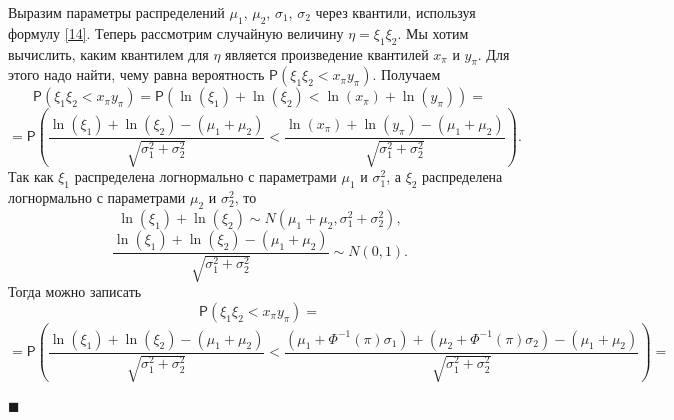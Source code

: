 \documentclass[12pt]{article}
\newenvironment{Proof}{\par\noindent{\bf Доказательство.}}{\hfill$\scriptstyle\blacksquare$}
\begin{document}
	\begin{Proof}
		Выразим параметры распределений $\mu_{1}$, $\mu_{2}$, $\sigma_{1}$, $\sigma_{2}$ через квантили, используя формулу \eqref{14}. Теперь рассмотрим случайную величину $\eta = \xi_{1}\xi_{2}$. Мы хотим вычислить, каким квантилем для $\eta$ является произведение квантилей $x_{\pi}$ и $y_{\pi}$. Для этого надо найти, чему равна вероятность $\mathsf{P}(\xi_{1}\xi_{2}< x_{\pi}y_{\pi})$. Получаем
		\begin{equation*}
			\mathsf{P}(\xi_{1}\xi_{2}< x_{\pi}y_{\pi}) = \mathsf{P}(\ln(\xi_{1})+\ln(\xi_{2})<\ln(x_{\pi})+\ln(y_{\pi}))=
		\end{equation*}
		\begin{equation*}
			=\mathsf{P}\left(\displaystyle{\frac{\ln(\xi_{1})+\ln(\xi_{2})-(\mu_{1}+\mu_{2})}{\sqrt{\sigma_{1}^{2}+\sigma_{2}^{2}}}}<\displaystyle{\frac{\ln(x_{\pi})+\ln(y_{\pi})-(\mu_{1}+\mu_{2})}{\sqrt{\sigma_{1}^{2}+\sigma_{2}^{2}}}}\right).
		\end{equation*}
		Так как $\xi_{1}$ распределена логнормально с параметрами $\mu_{1}$ и $\sigma_{1}^{2}$, а $\xi_{2}$ распределена логнормально с параметрами $\mu_{2}$ и $\sigma_{2}^{2}$, то
		\begin{equation*} 
			\ln(\xi_{1})+\ln(\xi_{2})\sim N(\mu_{1}+\mu_{2}, \sigma_{1}^{2}+\sigma_{2}^{2}),
		\end{equation*}
		\begin{equation*}
			\frac{\ln(\xi_{1})+\ln(\xi_{2})-(\mu_{1}+\mu_{2})}{\sqrt{\sigma_{1}^{2}+\sigma_{2}^{2}}} \sim N(0,1).
		\end{equation*}
		Тогда можно записать
		\begin{equation*}
			\mathsf{P}(\xi_{1}\xi_{2}< x_{\pi}y_{\pi}) =
		\end{equation*}
		\begin{equation*}
			=\mathsf{P}\left(\displaystyle{\frac{\ln(\xi_{1})+\ln(\xi_{2})-(\mu_{1}+\mu_{2})}{\sqrt{\sigma_{1}^{2}+\sigma_{2}^{2}}}}<\displaystyle{\frac{(\mu_{1}+\Phi^{-1}(\pi)\sigma_{1})+(\mu_{2}+\Phi^{-1}(\pi)\sigma_{2})-(\mu_{1}+\mu_{2})}{\sqrt{\sigma_{1}^{2}+\sigma_{2}^{2}}}}\right)=
		\end{equation*}
		

\end{Proof}
\end{document}
